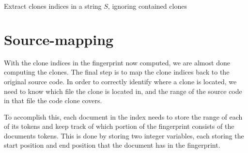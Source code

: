 \begin{algorithm}[htp!]
  \SetAlgoLined\DontPrintSemicolon

  \vspace{0.5cm}
  \caption{Extract clones indices in a string $S$, ignoring contained clones}
  \label{alg:cloneextraction}
\end{algorithm}

\section{Source-mapping}

With the clone indices in the fingerprint now computed, we are almost done computing the
clones. The final step is to map the clone indices back to the original source code. In
order to correctly identify where a clone is located, we need to know which file the clone
is located in, and the range of the source code in that file the code clone covers.

To accomplish this, each document in the index needs to store the range of each of its
tokens and keep track of which portion of the fingerprint consists of the documents
tokens. This is done by storing two integer variables, each storing the start position and
end position that the document has in the fingerprint. 

